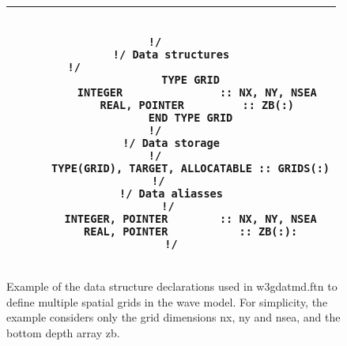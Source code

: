 \begin{figure}
\begin{center} \begin{tabular}{|c|} \hline 
\begin{minipage}[t]{4.5in}
\begin{verbatim}

!/     
!/ Data structures
!/                              
      TYPE GRID
        INTEGER               :: NX, NY, NSEA
        REAL, POINTER         :: ZB(:)
      END TYPE GRID
!/     
!/ Data storage
!/     
      TYPE(GRID), TARGET, ALLOCATABLE :: GRIDS(:)
!/    
!/ Data aliasses
!/ 
      INTEGER, POINTER        :: NX, NY, NSEA
      REAL, POINTER           :: ZB(:):
!/

\end{verbatim}
\end{minipage} \\ \hline
\end{tabular} \end{center}

\caption{Example of the data structure declarations used in {\file
         w3gdatmd.ftn} to define multiple spatial grids in the wave
         model. For simplicity, the example considers only the grid
         dimensions {\F nx}, {\F ny} and {\F nsea}, and the bottom
         depth array {\F zb}.}
\label{fig:struc_1}

\botline
\end{figure}

